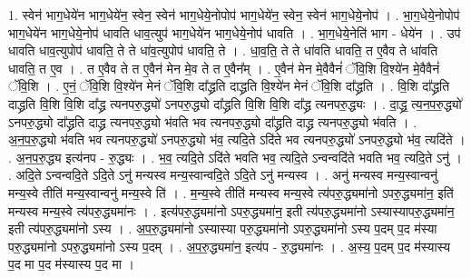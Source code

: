 \documentclass[17pt]{extarticle}
\begin{document}
1. स्वेन॑ भाग॒धेये॑न भाग॒धेये॑न॒ स्वेन॒ स्वेन॑ भाग॒धेये॒नोपोप॑ भाग॒धेये॑न॒ स्वेन॒ स्वेन॑ भाग॒धेये॒नोप॑ । . भा॒ग॒धेये॒नोपोप॑ भाग॒धेये॑न भाग॒धेये॒नोप॑ धावति धाव॒त्युप॑ भाग॒धेये॑न भाग॒धेये॒नोप॑ धावति । . भा॒ग॒धेये॒नेति॑ भाग - धेये॑न । . उप॑ धावति धाव॒त्युपोप॑ धावति॒ ते ते धा॑व॒त्युपोप॑ धावति॒ ते । . धा॒व॒ति॒ ते ते धा॑वति धावति॒ त ए॒वैव ते धा॑वति धावति॒ त ए॒व । . त ए॒वैव ते त ए॒वैन॑ मेन मे॒व ते त ए॒वैन᳚म् । . ए॒वैन॑ मेन मे॒वैवैनं॑ ॅवि॒शि वि॒श्ये॑न मे॒वैवैनं॑ ॅवि॒शि । . ए॒नं॒ ॅवि॒शि वि॒श्ये॑न मेनं ॅवि॒शि दा᳚द्ध्रति दाद्ध्रति वि॒श्ये॑न मेनं ॅवि॒शि दा᳚द्ध्रति । . वि॒शि दा᳚द्ध्रति दाद्ध्रति वि॒शि वि॒शि दा᳚द्ध्र त्यनपरु॒द्ध्यो॑ ऽनपरु॒द्ध्यो दा᳚द्ध्रति वि॒शि वि॒शि दा᳚द्ध्र त्यनपरु॒द्ध्यः । . दा॒द्ध्र॒ त्य॒न॒प॒रु॒द्ध्यो॑ ऽनपरु॒द्ध्यो दा᳚द्ध्रति दाद्ध्र त्यनपरु॒द्ध्यो भ॑वति भव त्यनपरु॒द्ध्यो दा᳚द्ध्रति दाद्ध्र त्यनपरु॒द्ध्यो भ॑वति । . अ॒न॒प॒रु॒द्ध्यो भ॑वति भव त्यनपरु॒द्ध्यो॑ ऽनपरु॒द्ध्यो भ॑व॒ त्यदि॒ते ऽदि॑ते भव त्यनपरु॒द्ध्यो॑ ऽनपरु॒द्ध्यो भ॑व॒ त्यदि॑ते । . अ॒न॒प॒रु॒द्ध्य इत्य॑नप - रु॒द्ध्यः । . भ॒व॒ त्यदि॒ते ऽदि॑ते भवति भव॒ त्यदि॒ते ऽन्वन्वदि॑ते भवति भव॒ त्यदि॒ते ऽनु॑ । . अदि॒ते ऽन्वन्वदि॒ते ऽदि॒ते ऽनु॑ मन्यस्व मन्य॒स्वान्वदि॒ते ऽदि॒ते ऽनु॑ मन्यस्व । . अनु॑ मन्यस्व मन्य॒स्वान्वनु॑ मन्य॒स्वे तीति॑ मन्य॒स्वान्वनु॑ मन्य॒स्वे ति॑ । . म॒न्य॒स्वे तीति॑ मन्यस्व मन्य॒स्वे त्य॑परु॒द्ध्यमा॑नो ऽपरु॒द्ध्यमा॑न॒ इति॑ मन्यस्व मन्य॒स्वे त्य॑परु॒द्ध्यमा॑नः । . इत्य॑परु॒द्ध्यमा॑नो ऽपरु॒द्ध्यमा॑न॒ इती त्य॑परु॒द्ध्यमा॑नो ऽस्यास्यापरु॒द्ध्यमा॑न॒ इती त्य॑परु॒द्ध्यमा॑नो ऽस्य । . अ॒प॒रु॒द्ध्यमा॑नो ऽस्यास्या परु॒द्ध्यमा॑नो ऽपरु॒द्ध्यमा॑नो ऽस्य प॒दम् प॒द म॑स्या परु॒द्ध्यमा॑नो ऽपरु॒द्ध्यमा॑नो ऽस्य प॒दम् । . अ॒प॒रु॒द्ध्यमा॑न॒ इत्य॑प - रु॒द्ध्यमा॑नः । . अ॒स्य॒ प॒दम् प॒द म॑स्यास्य प॒द मा प॒द म॑स्यास्य प॒द मा । \newline
\end{document}
